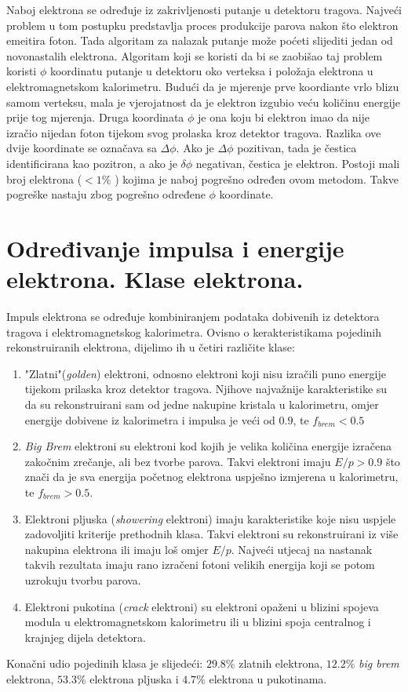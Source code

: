 \documentclass[a4paper,12pt]{report}
\begin{document}
Naboj elektrona se određuje iz zakrivljenosti putanje u detektoru tragova. Najveći problem u tom postupku predstavlja proces produkcije parova nakon što elektron emeitira foton. Tada algoritam za nalazak putanje može poćeti slijediti jedan od novonastalih elektrona. Algoritam koji se koristi da bi se zaobišao taj problem koristi $\phi$ koordinatu putanje u detektoru oko verteksa i položaja elektrona u elektromagnetskom kalorimetru. Budući da je mjerenje prve koordiante vrlo blizu samom verteksu, mala je vjerojatnost da je elektron izgubio veću količinu energije prije tog mjerenja. Druga koordinata $\phi$ je ona koju bi elektron imao da nije izračio nijedan foton tijekom svog prolaska kroz detektor tragova. Razlika ove dvije koordinate se označava sa $\Delta \phi$. Ako je $\Delta \phi$ pozitivan, tada je čestica identificirana kao pozitron, a ako je $\delta \phi$ negativan, čestica je elektron. Postoji mali broj elektrona ($<1\%$ \cite{david}) kojima je naboj pogrešno određen ovom metodom. Takve pogreške nastaju zbog pogrešno određene $\phi$ koordinate.
\section{Određivanje impulsa i energije elektrona. Klase elektrona.}
Impuls elektrona se određuje kombiniranjem podataka dobivenih iz detektora tragova i elektromagnetskog kalorimetra. Ovisno o kerakteristikama pojedinih rekonstruiranih elektrona, dijelimo ih u četiri različite klase:
\begin{enumerate}
 \item "Zlatni"(\textit{golden}) elektroni, odnosno elektroni koji nisu izračili puno energije tijekom prilaska kroz detektor tragova. Njihove najvažnije karakteristike su da su rekonstruirani sam od jedne nakupine kristala u kalorimetru, omjer energije dobivene iz kalorimetra i impulsa je veći od $0.9$, te $f_{brem}<0.5$
  \item \textit{Big Brem} elektroni su elektroni kod kojih je velika količina energije izračena zakočnim zrečanje, ali bez tvorbe parova. Takvi elektroni imaju $E/p>0.9$ što znači da je sva energija početnog elektrona uspješno izmjerena u kalorimetru, te $f_{brem}>0.5$. 
  \item Elektroni pljuska (\textit{showering} elektroni) imaju karakteristike koje nisu uspjele zadovoljiti kriterije prethodnih klasa. Takvi elektroni su rekonstruirani iz više nakupina elektrona ili imaju loš omjer $E/p$. Najveći utjecaj na nastanak takvih rezultata imaju rano izračeni fotoni velikih energija koji se potom uzrokuju tvorbu parova.
  \item Elektroni pukotina (\textit{crack} elektroni) su elektroni opaženi u blizini spojeva modula u elektromagnetskom kalorimetru ili u blizini spoja centralnog i krajnjeg dijela detektora. 
\end{enumerate}
Konačni udio pojedinih klasa je slijedeći: $29.8\%$ zlatnih elektrona, $12.2\%$ \textit{big brem} elektrona, $53.3\%$ elektrona pljuska i $4.7\%$ elektrona u pukotinama. \cite{klase}
\end{document}
